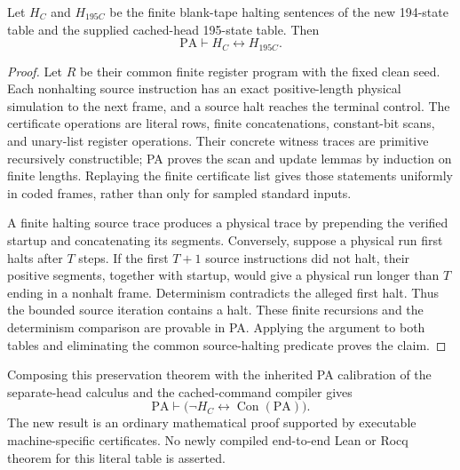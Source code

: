 \begin{theorem}
Let $H_C$ and $H_{195C}$ be the finite blank-tape halting sentences of
the new 194-state table and the supplied cached-head 195-state table.
Then
\[
                 \mathrm{PA}\vdash H_C\leftrightarrow H_{195C}.
\]
\end{theorem}
\begin{proof}
Let $R$ be their common finite register program with the fixed clean
seed. Each nonhalting source instruction has an exact positive-length
physical simulation to the next frame, and a source halt reaches the
terminal control. The certificate operations are literal rows, finite
concatenations, constant-bit scans, and unary-list register operations.
Their concrete witness traces are primitive recursively constructible;
PA proves the scan and update lemmas by induction on finite lengths.
Replaying the finite certificate list gives those statements uniformly
in coded frames, rather than only for sampled standard inputs.

A finite halting source trace produces a physical trace by prepending
the verified startup and concatenating its segments. Conversely, suppose
a physical run first halts after $T$ steps. If the first $T+1$ source
instructions did not halt, their positive segments, together with
startup, would give a physical run longer than $T$ ending in a nonhalt
frame. Determinism contradicts the alleged first halt. Thus the bounded
source iteration contains a halt. These finite recursions and the
determinism comparison are provable in PA. Applying the argument to
both tables and eliminating the common source-halting predicate proves
the claim.
\end{proof}

Composing this preservation theorem with the inherited PA calibration
of the separate-head calculus and the cached-command compiler gives
\[
 \boxed{\mathrm{PA}\vdash
   \bigl(\neg H_C\leftrightarrow\operatorname{Con}(\mathrm{PA})\bigr).}
\]
The new result is an ordinary mathematical proof supported by executable
machine-specific certificates. No newly compiled end-to-end Lean or Rocq
theorem for this literal table is asserted.
